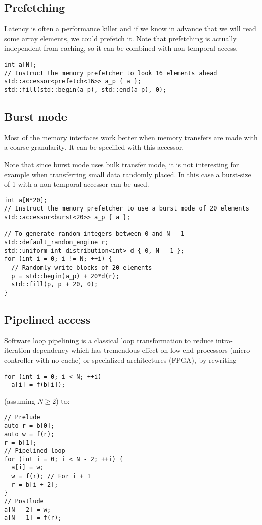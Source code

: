 \documentclass[a4paper]{article}
\begin{document}
\subsection{Prefetching}
\label{sec:prefetching}

Latency is often a performance killer and if we know in advance that
we will read some array elements, we could prefetch it. Note that
prefetching is actually independent from caching, so it can be
combined with non temporal access.

\begin{lstlisting}
int a[N];
// Instruct the memory prefetcher to look 16 elements ahead
std::accessor<prefetch<16>> a_p { a };
std::fill(std::begin(a_p), std::end(a_p), 0);
\end{lstlisting}


\subsection{Burst mode}
\label{sec:burst-mode}

Most of the memory interfaces work better when memory transfers are
made with a coarse granularity. It can be specified with this accessor.

Note that since burst mode uses bulk transfer mode, it is not
interesting for example when transferring small data randomly
placed. In this case a burst-size of 1 with a non temporal accessor
can be used.

\begin{lstlisting}
int a[N*20];
// Instruct the memory prefetcher to use a burst mode of 20 elements
std::accessor<burst<20>> a_p { a };

// To generate random integers between 0 and N - 1
std::default_random_engine r;
std::uniform_int_distribution<int> d { 0, N - 1 };
for (int i = 0; i != N; ++i) {
  // Randomly write blocks of 20 elements
  p = std::begin(a_p) + 20*d(r);
  std::fill(p, p + 20, 0);
}
\end{lstlisting}


\subsection{Pipelined access}
\label{sec:pipelined-access}

Software loop pipelining is a classical loop transformation to reduce
intra-iteration dependency which has tremendous effect on low-end
processors (micro-controller with no cache) or specialized
architectures (FPGA), by rewriting
\begin{lstlisting}
for (int i = 0; i < N; ++i)
  a[i] = f(b[i]);
\end{lstlisting}
(assuming $N \geq 2$) to:
\begin{lstlisting}
// Prelude
auto r = b[0];
auto w = f(r);
r = b[1];
// Pipelined loop
for (int i = 0; i < N - 2; ++i) {
  a[i] = w;
  w = f(r); // For i + 1
  r = b[i + 2];
}
// Postlude
a[N - 2] = w;
a[N - 1] = f(r);
\end{lstlisting}
\end{document}
